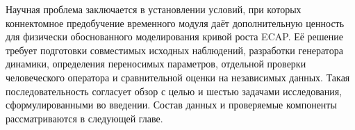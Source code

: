 Научная проблема заключается в установлении условий, при которых коннектомное предобучение временного модуля даёт дополнительную ценность для физически обоснованного моделирования кривой роста ECAP. Её решение требует подготовки совместимых исходных наблюдений, разработки генератора динамики, определения переносимых параметров, отдельной проверки человеческого оператора и сравнительной оценки на независимых данных. Такая последовательность согласует обзор с целью и шестью задачами исследования, сформулированными во введении. Состав данных и проверяемые компоненты рассматриваются в следующей главе.
